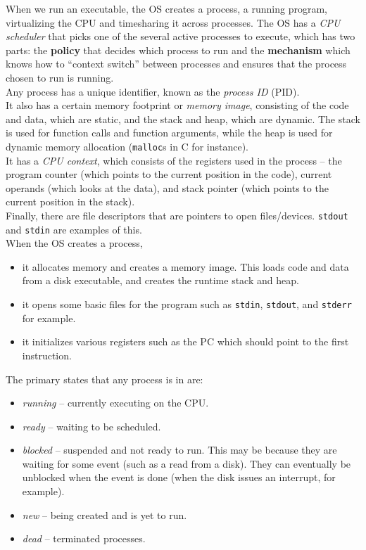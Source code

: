 \documentclass{article}
\begin{document}
		When we run an executable, the OS creates a process, a running program, virtualizing the CPU and timesharing it across processes. The OS has a \emph{CPU scheduler} that picks one of the several active processes to execute, which has two parts: the \textbf{policy} that decides which process to run and the \textbf{mechanism} which knows how to ``context switch'' between processes and ensures that the process chosen to run is running.\\

		Any process has a unique identifier, known as the \emph{process ID} (PID).\\
		It also has a certain memory footprint or \emph{memory image}, consisting of the code and data, which are static, and the stack and heap, which are dynamic. The stack is used for function calls and function arguments, while the heap is used for dynamic memory allocation (\texttt{malloc}s in C for instance).\\
		It has a \emph{CPU context}, which consists of the registers used in the process -- the program counter (which points to the current position in the code), current operands (which looks at the data), and stack pointer (which points to the current position in the stack).\\
		Finally, there are file descriptors that are pointers to open files/devices. \texttt{stdout} and \texttt{stdin} are examples of this.\\

		When the OS creates a process,
		\begin{itemize}
			\item it allocates memory and creates a memory image. This loads code and data from a disk executable, and creates the runtime stack and heap.
			\item it opens some basic files for the program such as \texttt{stdin}, \texttt{stdout}, and \texttt{stderr} for example.
			\item it initializes various registers such as the PC which should point to the first instruction.
		\end{itemize}

		The primary states that any process is in are:
		\begin{itemize}
			\item \emph{running} -- currently executing on the CPU.
			\item \emph{ready} -- waiting to be scheduled.
			\item \emph{blocked} -- suspended and not ready to run. This may be because they are waiting for some event (such as a read from a disk). They can eventually be unblocked when the event is done (when the disk issues an interrupt, for example).
			\item \emph{new} -- being created and is yet to run.
			\item \emph{dead} -- terminated processes.		
		\end{itemize}
\end{document}
